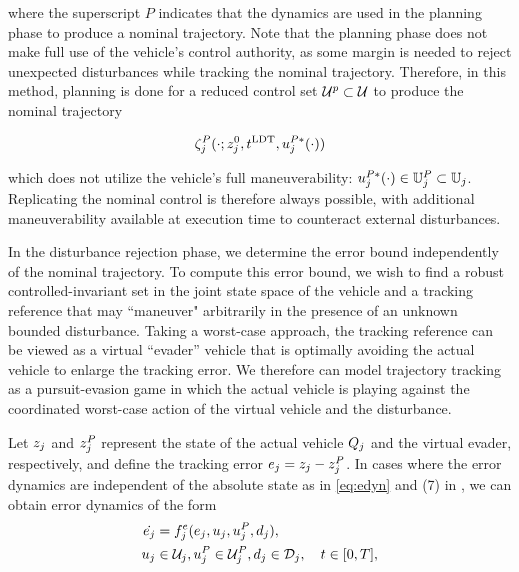 \noindent where the superscript $P$ indicates that the dynamics are used in the planning phase to produce a nominal trajectory. Note that the planning phase does not make full use of the vehicle's control authority, as some margin is needed to reject unexpected disturbances while tracking the nominal trajectory. Therefore, in this method, planning is done for a reduced control set $\mathcal{U}^p\subset\mathcal{U}$ to produce the nominal trajectory

\begin{equation}
\zeta_j^P(\cdot; z^0_j, t^\text{LDT}, u_j^{P*}(\cdot))
\end{equation}

\noindent which does not utilize the vehicle's full maneuverability: $u_j^{P*}(\cdot) \in \mathbb{U}_j^P \subset \mathbb{U}_j$. Replicating the nominal control is therefore always possible, with additional maneuverability available at execution time to counteract external disturbances.

In the disturbance rejection phase, we determine the error bound independently of the nominal trajectory. To compute this error bound, we wish to find a robust controlled-invariant set in the joint state space of the vehicle and a tracking reference that may ``maneuver" arbitrarily in the presence of an unknown bounded disturbance. Taking a worst-case approach, the tracking reference can be viewed as a virtual ``evader'' vehicle that is optimally avoiding the actual vehicle to enlarge the tracking error. We therefore can model trajectory tracking as a pursuit-evasion game in which the actual vehicle is playing against the coordinated worst-case action of the virtual vehicle and the disturbance. 

Let $z_j$ and $z_j^P$ represent the state of the actual vehicle $Q_{j}$ and the virtual evader, respectively, and define the tracking error $e_j=z_j-z_j^P$. In cases where the error dynamics are independent of the absolute state as in \eqref{eq:edyn} and (7) in \cite{Mitchell05}, we can obtain error dynamics of the form
\begin{equation}
\label{eq:edyn} %
\begin{aligned}
\dot{\errstate_j} &= \fdyn_j^\errstate(\errstate_j, \ctrl_j, \ctrl_j^P, \dstb_j), \\
\ctrl_j &\in \cset_j, \ctrl_j^P\in\cset^P_j, \dstb_j \in \dset_j, \quad t \in [0, T],
\end{aligned}
\end{equation}

